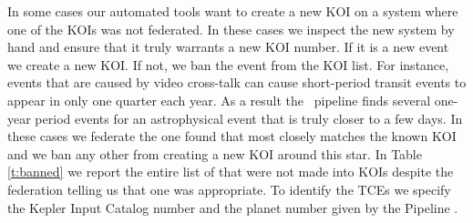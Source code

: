 In some cases our automated tools want to create a new KOI on a system where one of the KOIs was not federated.  In these cases we inspect the new system by hand and ensure that it truly warrants a new KOI number. If it is a new event we create a new KOI. If not, we ban the event from the KOI list.  For instance, events that are caused by video cross-talk \citep{KIH} can cause short-period transit events to appear in only one quarter each year. As a result the \Kepler\ pipeline finds several one-year period events for an astrophysical event that is truly closer to a few days.  In these cases we federate the one found that most closely matches the known KOI and we ban any other  from creating a new KOI around this star. In Table\,\ref{t:banned} we report the entire list of  that were not made into KOIs despite the federation telling us that one was appropriate. To identify the TCEs we specify the Kepler Input Catalog number and the planet number given by the \Kepler{} Pipeline \citep{Twicken2016}.


